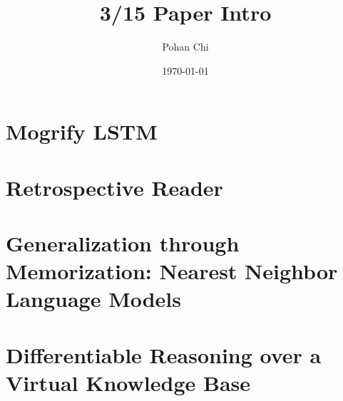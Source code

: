 \documentclass[10pt]{beamer}
\title{3/15 Paper Intro}
\subtitle{}
\author{Pohan Chi}
\date{\today}
\begin{document}
\maketitle

\maketoc

\section{Mogrify LSTM}

\section{Retrospective Reader}

\section{Generalization through Memorization: Nearest Neighbor Language Models}

\section{Differentiable Reasoning over a Virtual Knowledge Base}

\begin{frame}

\end{frame}
\end{document}
